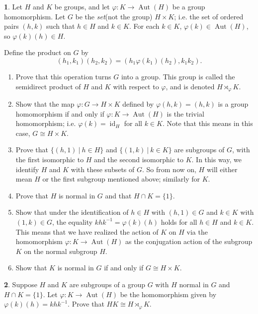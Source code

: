 \documentclass[12pt]{article}
\newcommand{\Aut}{\operatorname{Aut}}
\newcommand{\id}{\operatorname{id}}
\theoremstyle{definition}
\newtheorem{ex}{}
\begin{document}
\begin{ex}
	Let $H$ and $K$ be groups, and let $\varphi\colon K \to \Aut(H)$ be a group homomorphism.
	Let $G$ be the \emph{set}(not the group) $H \times K$; i.e. the set of ordered pairs $(h,k)$ such
	that $h \in H$ and $k \in K$.  For each $k \in K$, $\varphi(k) \in \Aut(H)$,
	so $\varphi(k)(h) \in H$.

	Define the product on $G$ by
	$$(h_1,k_1)(h_2,k_2) = (h_1\varphi(k_1)(h_2),k_1k_2).$$

	\begin{enumerate}
		\item Prove that this operation turns $G$ into a group.  This group is called the semidirect product
		      of $H$ and $K$ with respect to $\varphi$, and is denoted $H \rtimes_\varphi K$.
		\item Show that the map $\varphi : G \to H \times K$ defined by $\varphi(h,k) = (h,k)$ is a group
		      homomorphism if and only if $\varphi \colon K \to \Aut(H)$ is the trivial homomorphism;
		      i.e. $\varphi(k) = \id_H$ for all $k \in K$.  Note that this means in this case,
		      $G \cong H \times K$.
		\item Prove that $\{(h,1)~|~h \in H\}$ and $\{(1,k)~|~k \in K\}$ are subgroups of $G$,
		      with the first isomorphic to $H$ and the second isomorphic to $K$.
		      In this way, we identify $H$ and $K$ with these subsets of $G$.  So from now on,
		      $H$ will either mean $H$ or the first subgroup mentioned above; similarly for $K$.
		\item Prove that $H$ is normal in $G$ and that $H \cap K = \{1\}$.
		\item Show that under the identification of $h \in H$ with $(h,1) \in G$
		      and $k \in K$ with $(1,k) \in G$, the equality $khk^{-1} = \varphi(k)(h)$ holds for all $h \in H$ and $k \in K$.
		      This means that we have realized the action of $K$ on $H$ via the homomorphism $\varphi : K \to \Aut(H)$
		      as the conjugation action of the subgroup $K$ on the normal subgroup $H$.
		\item Show that $K$ is normal in $G$ if and only if $G \cong H \times K$.
	\end{enumerate}
\end{ex}

\begin{ex}
	Suppose $H$ and $K$ are subgroups of a group $G$ with $H$ normal in $G$ and $H \cap K = \{1\}$.
	Let $\varphi\colon K \to \Aut(H)$ be the homomorphism given by $\varphi(k)(h) = khk^{-1}$.
	Prove that $HK \cong H \rtimes_\varphi K$.
\end{ex}
\end{document}
